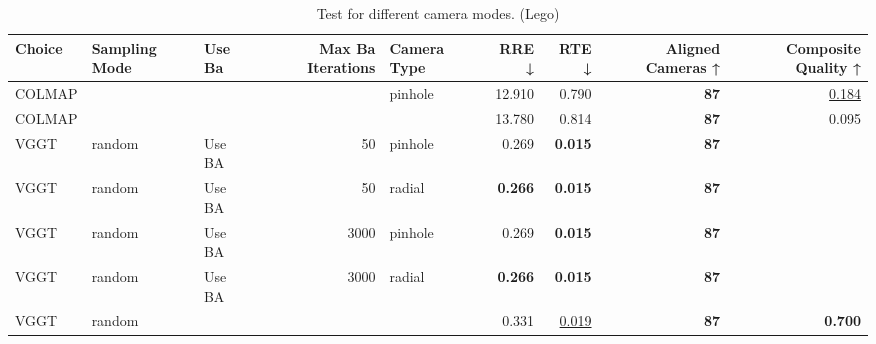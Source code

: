 \begin{table}[H]
\caption{Test for different camera modes. (Lego)}
\label{tab:99_camera_modes_lego}
\begin{tabular}{lllrlrrrr}
\toprule
Choice & Sampling Mode & Use Ba & Max Ba Iterations & Camera Type & RRE ↓ & RTE ↓ & Aligned Cameras ↑ & Composite Quality ↑ \\
\midrule
COLMAP &  &  &  & pinhole & 12.910 & 0.790 & \textbf{87} & \underline{0.184} \\
COLMAP &  &  &  &  & 13.780 & 0.814 & \textbf{87} & 0.095 \\
VGGT & random & Use BA & 50 & pinhole & 0.269 & \textbf{0.015} & \textbf{87} &  \\
VGGT & random & Use BA & 50 & radial & \textbf{0.266} & \textbf{0.015} & \textbf{87} &  \\
VGGT & random & Use BA & 3000 & pinhole & 0.269 & \textbf{0.015} & \textbf{87} &  \\
VGGT & random & Use BA & 3000 & radial & \textbf{0.266} & \textbf{0.015} & \textbf{87} &  \\
VGGT & random &  &  &  & 0.331 & \underline{0.019} & \textbf{87} & \textbf{0.700} \\
\bottomrule
\end{tabular}
\end{table}
